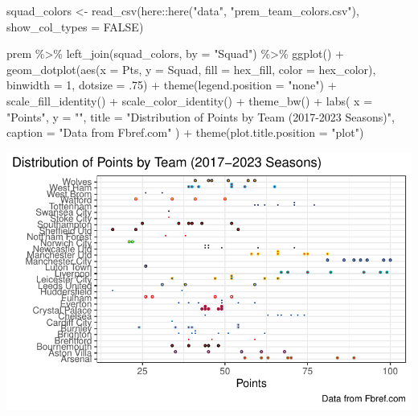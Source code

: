 \documentclass[
  letterpaper,
  DIV=11,
  numbers=noendperiod]{scrartcl}
\newenvironment{Shaded}{\begin{snugshade}}{\end{snugshade}}
\newcommand{\AttributeTok}[1]{\textcolor[rgb]{0.40,0.45,0.13}{#1}}
\newcommand{\ConstantTok}[1]{\textcolor[rgb]{0.56,0.35,0.01}{#1}}
\newcommand{\DecValTok}[1]{\textcolor[rgb]{0.68,0.00,0.00}{#1}}
\newcommand{\FunctionTok}[1]{\textcolor[rgb]{0.28,0.35,0.67}{#1}}
\newcommand{\NormalTok}[1]{\textcolor[rgb]{0.00,0.23,0.31}{#1}}
\newcommand{\OtherTok}[1]{\textcolor[rgb]{0.00,0.23,0.31}{#1}}
\newcommand{\SpecialCharTok}[1]{\textcolor[rgb]{0.37,0.37,0.37}{#1}}
\newcommand{\StringTok}[1]{\textcolor[rgb]{0.13,0.47,0.30}{#1}}
\begin{document}
\begin{Shaded}
\begin{Highlighting}[]
\NormalTok{squad\_colors }\OtherTok{\textless{}{-}} \FunctionTok{read\_csv}\NormalTok{(here}\SpecialCharTok{::}\FunctionTok{here}\NormalTok{(}\StringTok{"data"}\NormalTok{, }\StringTok{"prem\_team\_colors.csv"}\NormalTok{), }\AttributeTok{show\_col\_types =} \ConstantTok{FALSE}\NormalTok{)}

\NormalTok{prem }\SpecialCharTok{\%\textgreater{}\%}
  \FunctionTok{left\_join}\NormalTok{(squad\_colors, }\AttributeTok{by =} \StringTok{"Squad"}\NormalTok{) }\SpecialCharTok{\%\textgreater{}\%}
  \FunctionTok{ggplot}\NormalTok{() }\SpecialCharTok{+}
  \FunctionTok{geom\_dotplot}\NormalTok{(}\FunctionTok{aes}\NormalTok{(}\AttributeTok{x =}\NormalTok{ Pts, }\AttributeTok{y =}\NormalTok{ Squad, }\AttributeTok{fill =}\NormalTok{ hex\_fill, }\AttributeTok{color =}\NormalTok{ hex\_color), }\AttributeTok{binwidth =} \DecValTok{1}\NormalTok{, }\AttributeTok{dotsize =}\NormalTok{ .}\DecValTok{75}\NormalTok{) }\SpecialCharTok{+}
  \FunctionTok{theme}\NormalTok{(}\AttributeTok{legend.position =} \StringTok{"none"}\NormalTok{) }\SpecialCharTok{+}
  \FunctionTok{scale\_fill\_identity}\NormalTok{() }\SpecialCharTok{+}
  \FunctionTok{scale\_color\_identity}\NormalTok{() }\SpecialCharTok{+}
  \FunctionTok{theme\_bw}\NormalTok{() }\SpecialCharTok{+}
  \FunctionTok{labs}\NormalTok{(}
    \AttributeTok{x =} \StringTok{"Points"}\NormalTok{,}
    \AttributeTok{y =} \StringTok{""}\NormalTok{,}
    \AttributeTok{title =} \StringTok{"Distribution of Points by Team (2017{-}2023 Seasons)"}\NormalTok{,}
    \AttributeTok{caption =} \StringTok{"Data from Fbref.com"}
\NormalTok{    ) }\SpecialCharTok{+}
  \FunctionTok{theme}\NormalTok{(}\AttributeTok{plot.title.position =} \StringTok{"plot"}\NormalTok{)}
\end{Highlighting}
\end{Shaded}

\includegraphics{project_part_3_files/figure-pdf/dot-plot-points-dist-1.pdf}
\end{document}
